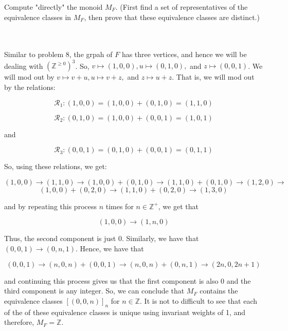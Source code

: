 Compute "directly" the monoid $M_F$. (First find a set of representatives of the equivalence classes in
$M_F$, then prove that these equivalence classes are distinct.)\\\\

\begin{solution}\renewcommand{\qedsymbol}{}\ \\
    Similar to problem 8, the grpah of $F$ has three vertices, and hence we will be dealing with
    $(\mathbb{Z}^{\geq0})^3$. So, $v\mapsto(1,0,0), u\mapsto(0,1,0),$ and $z\mapsto(0,0,1)$. We will mod
    out by $v\mapsto v+u, u\mapsto v+z,$ and $z\mapsto u+z$. That is, we will mod out by the relations:

    $$\mathcal{R}_1:(1,0,0)=(1,0,0)+(0,1,0)=(1,1,0)$$

    $$\mathcal{R}_2:(0,1,0)=(1,0,0)+(0,0,1)=(1,0,1)$$

    and

    $$\mathcal{R}_3:(0,0,1)=(0,1,0)+(0,0,1)=(0,1,1)$$

    So, using these relations, we get:

    $$(1,0,0)\to(1,1,0)\to(1,0,0)+(0,1,0)\to(1,1,0)+(0,1,0)\to(1,2,0)\to$$
    $$(1,0,0)+(0,2,0)\to(1,1,0)+(0,2,0)\to(1,3,0)$$

    and by repeating this process $n$ times for $n\in\mathbb{Z}^+$, we get that

    $$(1,0,0)\to(1,n,0)$$

    Thus, the second component is just 0. Similarly, we have that $(0,0,1)\to(0,n,1)$. Hence, we have
    that

    $$(0,0,1)\to(n,0,n)+(0,0,1)\to(n,0,n)+(0,n,1)\to(2n,0,2n+1)$$

    and continuing this process gives us that the first component is also $0$ and the third component is
    any integer. So, we can conclude that $M_F$ contains the equivalence classes $[(0,0,n)]_n$ for
    $n\in\mathbb{Z}$. It is not to difficult to see that each of the of these equivalence classes is
    unique using invariant weights of 1, and therefore, $M_F=\mathbb{Z}$.

\end{solution}